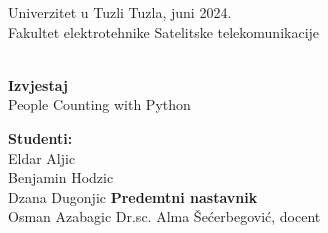 \documentclass[10pt]{article}
\newcounter{logo_stil}
\begin{document}
\renewcommand{\figurename}{Slika}
\renewcommand{\arraystretch}{1.4}
\renewcommand{\contentsname}{Sadrzaj}
\renewcommand{\listfigurename}{Lista slika}
\renewcommand{\listtablename}{Lista tabela}
\renewcommand{\abstractname}{Sazetak ili abstract}



\noindent Univerzitet u Tuzli \hfill  Tuzla, juni 2024. \\
\noindent Fakultet elektrotehnike \hfill Satelitske telekomunikacije \\
\noindent \hfill  \\




\begin{center}

\vspace{60mm}

\LARGE{}\textbf{Izvjestaj} \\
\vspace{5mm}
People Counting with Python
\end{center} 
\vspace{5mm}

\vfill{
	\noindent \textbf{Studenti:} \\ %
	\noindent Eldar Aljic  \\
	\noindent Benjamin Hodzic   \\ 
	\noindent Dzana Dugonjic \hfill \textbf{ Predemtni nastavnik } \\ 
	\noindent Osman Azabagic  \hfill Dr.sc. Alma Šećerbegović, docent}
\vspace{10mm}
\end{document}
